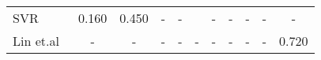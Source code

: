 \documentclass{article}
\begin{document}
\begin{table*}[]
\begin{tabular}{lcccccccccc}
SVR~\cite{zhang2021speechocean762}                              & 0.160                                                                         & 0.450                                                                        & -                                                                             & -                                                                             &                                                                               & -                                                                             & -                                                                             & -                                                                             & -                                                                             & -                                                                             \\
Lin et.al~\cite{lin2021deep}                                   & -                                                                             & -                                                                            & -                                                                             & -                                                                             & -                                                                             & -                                                                             & -                                                                             & -                                                                             & -                                                                             & 0.720                                                                         \\ \hline

\end{tabular}
\end{table*}
\end{document}
